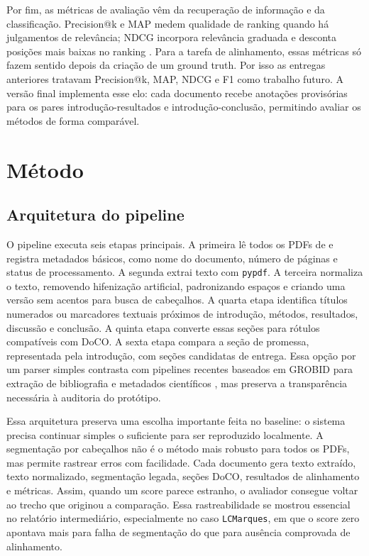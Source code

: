 \documentclass[12pt]{article}
\begin{document}
Por fim, as métricas de avaliação vêm da recuperação de informação e da classificação. Precision@k e MAP medem qualidade de ranking quando há julgamentos de relevância; NDCG incorpora relevância graduada e desconta posições mais baixas no ranking \cite{jarvelin2002cumulated}. Para a tarefa de alinhamento, essas métricas só fazem sentido depois da criação de um ground truth. Por isso as entregas anteriores tratavam Precision@k, MAP, NDCG e F1 como trabalho futuro. A versão final implementa esse elo: cada documento recebe anotações provisórias para os pares introdução-resultados e introdução-conclusão, permitindo avaliar os métodos de forma comparável.

\section{Método}

\subsection{Arquitetura do pipeline}

O pipeline executa seis etapas principais. A primeira lê todos os PDFs de  e registra metadados básicos, como nome do documento, número de páginas e status de processamento. A segunda extrai texto com \texttt{pypdf}. A terceira normaliza o texto, removendo hifenização artificial, padronizando espaços e criando uma versão sem acentos para busca de cabeçalhos. A quarta etapa identifica títulos numerados ou marcadores textuais próximos de introdução, métodos, resultados, discussão e conclusão. A quinta etapa converte essas seções para rótulos compatíveis com DoCO. A sexta etapa compara a seção de promessa, representada pela introdução, com seções candidatas de entrega. Essa opção por um parser simples contrasta com pipelines recentes baseados em GROBID para extração de bibliografia e metadados científicos \cite{nguyen2023bibliography}, mas preserva a transparência necessária à auditoria do protótipo.

Essa arquitetura preserva uma escolha importante feita no baseline: o sistema precisa continuar simples o suficiente para ser reproduzido localmente. A segmentação por cabeçalhos não é o método mais robusto para todos os PDFs, mas permite rastrear erros com facilidade. Cada documento gera texto extraído, texto normalizado, segmentação legada, seções DoCO, resultados de alinhamento e métricas. Assim, quando um score parece estranho, o avaliador consegue voltar ao trecho que originou a comparação. Essa rastreabilidade se mostrou essencial no relatório intermediário, especialmente no caso \texttt{LCMarques}, em que o score zero apontava mais para falha de segmentação do que para ausência comprovada de alinhamento.
\end{document}
